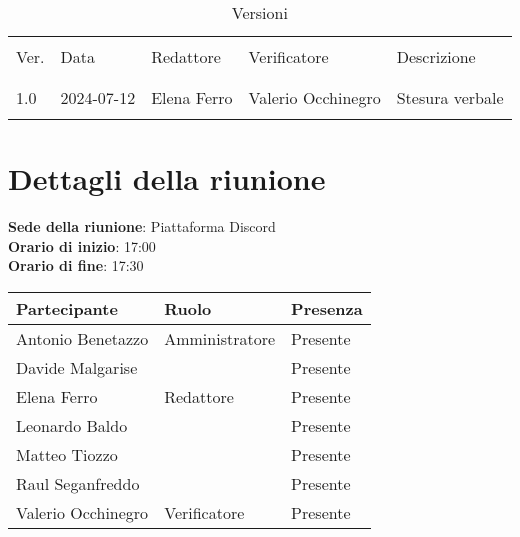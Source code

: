\documentclass[italian,12pt]{article}
\begin{document}
\newcommand{\mySkip}[1][]{#1}



\newpage



\begin{table}[!h]
	\caption{Versioni}
	\footnotesize
	\begin{center}
		\begin{tabular}{ l l l l p{6cm} }
			\hline                                                                       \\[-2ex]
			Ver. & Data       & Redattore         & Verificatore       & Descrizione     \\
			\\[-2ex] \hline \\[-1.5ex]
			1.0  & 2024-07-12 & Elena Ferro       & Valerio Occhinegro & Stesura verbale \\
			\\[-1.5ex] \hline
		\end{tabular}
	\end{center}
\end{table}

\newpage

\tableofcontents

\newpage

\section{Dettagli della riunione}

\textbf{Sede della riunione}: Piattaforma Discord\\
\textbf{Orario di inizio}: 17:00\\
\textbf{Orario di fine}: 17:30\\

\begin{flushleft}
	\begin{table}[!h]
		\begin{tabular}{ |l|l|l| }
			\hline
			\textbf{Partecipante} & \textbf{Ruolo} & \textbf{Presenza} \\
			\hline
			Antonio Benetazzo     & Amministratore & Presente          \\
			Davide Malgarise      &                & Presente          \\
			Elena Ferro           & Redattore      & Presente          \\
			Leonardo Baldo        &                & Presente          \\
			Matteo Tiozzo         &                & Presente          \\
			Raul Seganfreddo      &                & Presente          \\
			Valerio Occhinegro    & Verificatore   & Presente          \\
			\hline
		\end{tabular}
	\end{table}
\end{flushleft}
\end{document}
